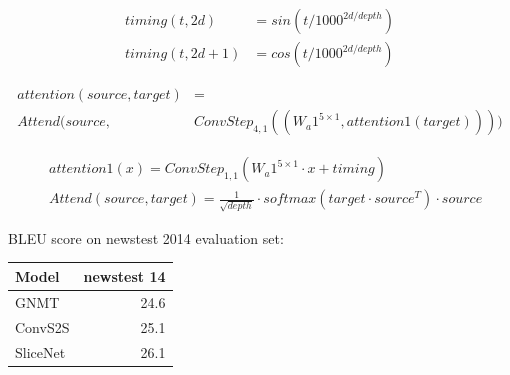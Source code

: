 \documentclass[a4paper]{article}
\begin{document}
\begin{align*}
  timing(t, 2d) &= sin(t/1000^{2d/depth}) \\
  timing(t, 2d + 1) &= cos(t/1000^{2d/depth})
\end{align*}


\begin{align*}
  attention(source, target) &= \\
    Attend(source, &ConvStep_{4,1}((W_a1^{5 \times 1}, attention1(target))))
\end{align*}


\begin{align*}
  &attention1(x) = ConvStep_{1,1}(W_a1^{5 \times 1} \cdot x + timing) \\
  &Attend(source, target) = \frac{1}{\sqrt{depth}} \cdot
    softmax(target \cdot source^T) \cdot source
\end{align*}


BLEU score on newstest 2014 evaluation set:


\begin{center}
  \begin{tabular}{lr}
  \hline
    Model & newstest 14 \\
  \hline
    GNMT & 24.6 \\
    ConvS2S & 25.1 \\
    SliceNet & 26.1 \\
  \hline
  \end{tabular}
\end{center}




\end{document}
